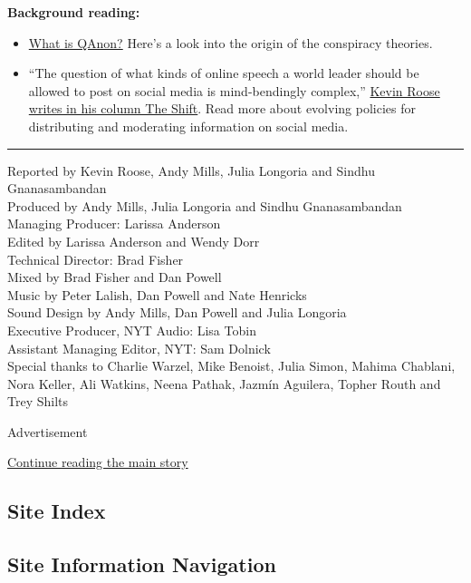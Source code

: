 \textbf{Background reading:}

\begin{itemize}
\item
  \href{https://www.nytimes3xbfgragh.onion/2018/08/01/us/politics/what-is-qanon.html?searchResultPosition=5}{What
  is QAnon?} Here's a look into the origin of the conspiracy theories.
\item
  ``The question of what kinds of online speech a world leader should be
  allowed to post on social media is mind-bendingly complex,''
  \href{https://www.nytimes3xbfgragh.onion/2020/05/29/technology/trump-twitter.html}{Kevin
  Roose writes in his column The Shift}. Read more about evolving
  policies for distributing and moderating information on social media.
\end{itemize}

\begin{center}\rule{0.5\linewidth}{\linethickness}\end{center}

Reported by Kevin Roose, Andy Mills, Julia Longoria and Sindhu
Gnanasambandan\\
Produced by Andy Mills, Julia Longoria and Sindhu Gnanasambandan\\
Managing Producer: Larissa Anderson\\
Edited by Larissa Anderson and Wendy Dorr\\
Technical Director: Brad Fisher\\
Mixed by Brad Fisher and Dan Powell\\
Music by Peter Lalish, Dan Powell and Nate Henricks\\
Sound Design by Andy Mills, Dan Powell and Julia Longoria\\
Executive Producer, NYT Audio: Lisa Tobin\\
Assistant Managing Editor, NYT: Sam Dolnick\\
Special thanks to Charlie Warzel, Mike Benoist, Julia Simon, Mahima
Chablani, Nora Keller, Ali Watkins, Neena Pathak, Jazmín Aguilera,
Topher Routh and Trey Shilts

Advertisement

\protect\hyperlink{after-bottom}{Continue reading the main story}

\hypertarget{site-index}{%
\subsection{Site Index}\label{site-index}}

\hypertarget{site-information-navigation}{%
\subsection{Site Information
Navigation}\label{site-information-navigation}}

